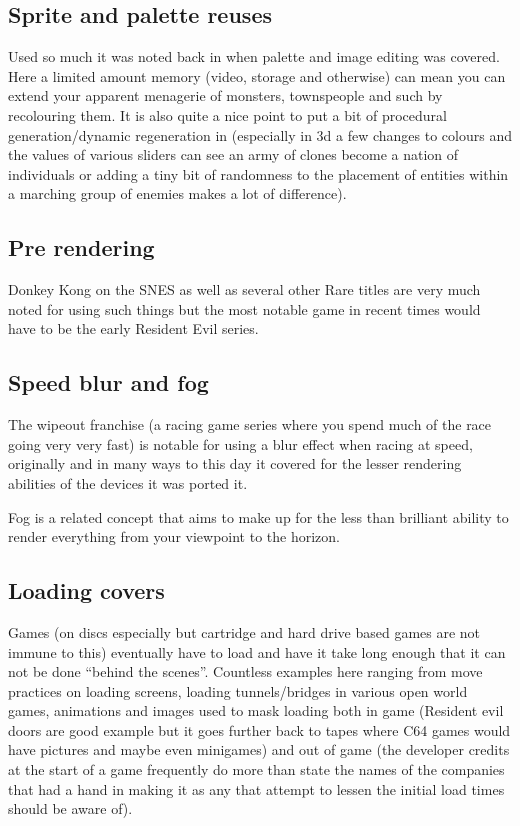 \documentclass[
]{book}
\begin{document}
\hypertarget{sprite-and-palette-reuses}{%
\subsection{Sprite and palette reuses}\label{sprite-and-palette-reuses}}

Used so much it was noted back in when palette and image editing was covered. Here a limited amount memory (video, storage and otherwise) can mean you can extend your apparent menagerie of monsters, townspeople and such by recolouring them. It is also quite a nice point to put a bit of procedural generation/dynamic regeneration in (especially in 3d a few changes to colours and the values of various sliders can see an army of clones become a nation of individuals or adding a tiny bit of randomness to the placement of entities within a marching group of enemies makes a lot of difference).

\hypertarget{pre-rendering}{%
\subsection{Pre rendering}\label{pre-rendering}}

Donkey Kong on the SNES as well as several other Rare titles are very much noted for using such things but the most notable game in recent times would have to be the early Resident Evil series.

\hypertarget{speed-blur-and-fog}{%
\subsection{Speed blur and fog}\label{speed-blur-and-fog}}

The wipeout franchise (a racing game series where you spend much of the race going very very fast) is notable for using a blur effect when racing at speed, originally and in many ways to this day it covered for the lesser rendering abilities of the devices it was ported it.

Fog is a related concept that aims to make up for the less than brilliant ability to render everything from your viewpoint to the horizon.

\hypertarget{loading-covers}{%
\subsection{Loading covers}\label{loading-covers}}

Games (on discs especially but cartridge and hard drive based games are not immune to this) eventually have to load and have it take long enough that it can not be done ``behind the scenes''. Countless examples here ranging from move practices on loading screens, loading tunnels/bridges in various open world games, animations and images used to mask loading both in game (Resident evil doors are good example but it goes further back to tapes where C64 games would have pictures and maybe even minigames) and out of game (the developer credits at the start of a game frequently do more than state the names of the companies that had a hand in making it as any that attempt to lessen the initial load times should be aware of).
\end{document}
